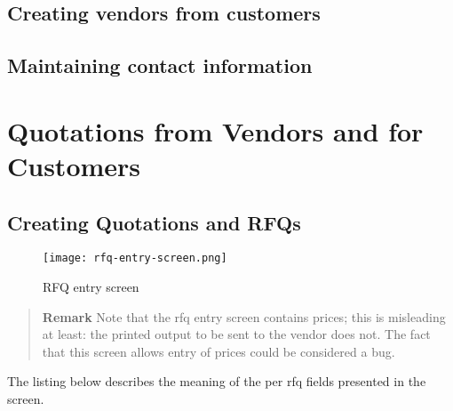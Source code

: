 \section{Creating vendors from customers}
\label{sec-workflows-customers-to-vendors}


\section{Maintaining contact information}
\label{sec-workflows-customers-contact-information}
\chapter{Quotations from Vendors and for Customers}
\label{cha-workflows-quotations}

\section{Creating Quotations and RFQs}
\label{sec-workflows-quotations-creation}


\begin{figure}[h]
\centering
\texttt{[image: rfq-entry-screen.png]}
\caption{RFQ entry screen}
\label{fig:rfq-entry-screen}
\end{figure}

\begin{quotation}
\textbf{Remark} Note that the \gls{rfq} entry screen contains prices; this is misleading
at least: the printed output to be sent to the vendor does not. The fact that this screen
allows entry of prices could be considered a bug.
\end{quotation}

The listing below describes the meaning of the per \gls{rfq} fields presented in the screen.

